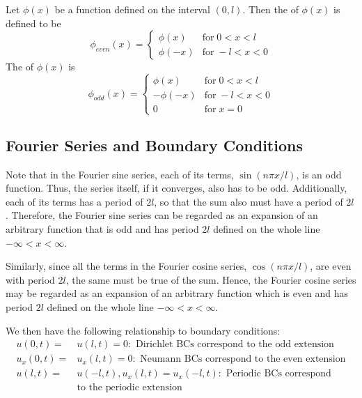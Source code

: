 \documentclass[12pt, a4paper, oneside, openright, titlepage]{book}
\begin{document}
\begin{defn}
    Let $\phi(x)$ be a function defined on the interval $(0,l)$. Then the  of $\phi(x)$ is defined to be \begin{equation*}
        \phi_{even}(x) = \left\{\begin{array}{lc} \phi(x) & \text{for}\;0<x<l \\ \phi(-x)& \text{for}\;-l < x < 0\end{array}\right.
    \end{equation*}
    The  of $\phi(x)$ is \begin{equation*}
        \phi_{odd}(x) = \left\{\begin{array}{lc} \phi(x) & \text{for}\;0<x<l \\ -\phi(-x)& \text{for}\;-l < x < 0 \\ 0 & \text{for}\; x= 0\end{array}\right.
    \end{equation*}
\end{defn}

\subsection{Fourier Series and Boundary Conditions}

Note that in the Fourier sine series, each of its terms, $\sin(n\pi x/l)$, is an odd function. Thus, the series itself, if it converges, also has to be odd. Additionally, each of its terms has a period of $2l$, so that the sum also must have a period of $2l$. Therefore, the Fourier sine series can be regarded as an expansion of an arbitrary function that is odd and has period $2l$ defined on the whole line $-\infty < x < \infty$.

Similarly, since all the terms in the Fourier cosine series, $\cos(n\pi x/l)$, are even with period $2l$, the same must be true of the sum. Hence, the Fourier cosine series may be regarded as an expansion of an arbitrary function which is even and has period $2l$ defined on the whole line $-\infty < x < \infty$.

We then have the following relationship to boundary conditions: \begin{align*}
    u(0,t) =&u(l,t)=0:\text{ Dirichlet BCs correspond to the odd extension} \\
    u_x(0,t)=&u_x(l,t)=0:\text{ Neumann BCs correspond to the even extension} \\
    u(l,t) =&u(-l,t),u_x(l,t) = u_x(-l,t):\text{ Periodic BCs correspond} \\
    &\text{to the periodic extension}
\end{align*}
\end{document}
